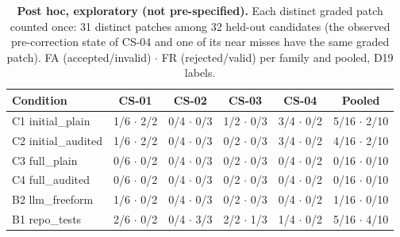 \begin{table}[t]\centering\footnotesize
\caption{\textbf{Post hoc, exploratory (not pre-specified).} Each distinct graded patch counted once: 31 distinct patches among 32 held-out candidates (the observed pre-correction state of CS-04 and one of its near misses have the same graded patch). FA (accepted/invalid) $\cdot$ FR (rejected/valid) per family and pooled, D19 labels.}\label{tab:expl-distinct}
\begin{tabular}{lccccc}\toprule Condition & CS-01 & CS-02 & CS-03 & CS-04 & Pooled \\\midrule
C1 initial\_plain & 1/6 $\cdot$ 2/2 & 0/4 $\cdot$ 0/3 & 1/2 $\cdot$ 0/3 & 3/4 $\cdot$ 0/2 & 5/16 $\cdot$ 2/10 \\
C2 initial\_audited & 1/6 $\cdot$ 2/2 & 0/4 $\cdot$ 0/3 & 0/2 $\cdot$ 0/3 & 3/4 $\cdot$ 0/2 & 4/16 $\cdot$ 2/10 \\
C3 full\_plain & 0/6 $\cdot$ 0/2 & 0/4 $\cdot$ 0/3 & 0/2 $\cdot$ 0/3 & 0/4 $\cdot$ 0/2 & 0/16 $\cdot$ 0/10 \\
C4 full\_audited & 0/6 $\cdot$ 0/2 & 0/4 $\cdot$ 0/3 & 0/2 $\cdot$ 0/3 & 0/4 $\cdot$ 0/2 & 0/16 $\cdot$ 0/10 \\
B2 llm\_freeform & 1/6 $\cdot$ 0/2 & 0/4 $\cdot$ 0/3 & 0/2 $\cdot$ 0/3 & 0/4 $\cdot$ 0/2 & 1/16 $\cdot$ 0/10 \\
B1 repo\_tests & 2/6 $\cdot$ 0/2 & 0/4 $\cdot$ 3/3 & 2/2 $\cdot$ 1/3 & 1/4 $\cdot$ 0/2 & 5/16 $\cdot$ 4/10 \\
\bottomrule\end{tabular}\end{table}
